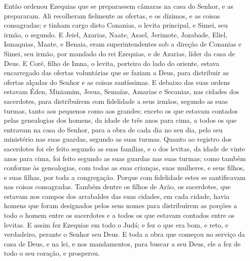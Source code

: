 Então ordenou Ezequias que se preparassem câmaras na casa do
Senhor, e as prepararam. Ali recolheram fielmente as ofertas,
e os dízimos, e as coisas consagradas; e tinham cargo disto
Conanias, o levita principal, e Simei, seu irmão, o segundo.
E Jeiel, Azarias, Naate, Asael, Jerimote, Jozabade, Eliel,
Ismaquias, Maate, e Benaia, eram superintendentes sob a direção de
Conanias e Simei, seu irmão, por mandado do rei Ezequias, e de
Azarias, líder da casa de Deus. E Coré, filho de Imna, o
levita, porteiro do lado do oriente, estava encarregado das ofertas
voluntárias que se faziam a Deus, para distribuir as ofertas alçadas
do Senhor e as coisas santíssimas. E debaixo das suas ordens
estavam Éden, Miniamim, Jesua, Semaías, Amarias e Secanias, nas
cidades dos sacerdotes, para distribuírem com fidelidade a seus
irmãos, segundo as suas turmas, tanto aos pequenos como aos grandes;
exceto os que estavam contados pelas genealogias dos homens,
da idade de três anos para cima, a todos os que entravam na casa do
Senhor, para a obra de cada dia no seu dia, pelo seu ministério nas
suas guardas, segundo as suas turmas. Quanto ao registro dos
sacerdotes foi ele feito segundo as suas famílias, e o dos levitas,
da idade de vinte anos para cima, foi feito segundo as suas guardas
nas suas turmas; como também conforme às genealogias, com
todas as suas crianças, suas mulheres, e seus filhos, e suas filhas,
por toda a congregação. Porque com fidelidade estes se santificavam
nas coisas consagradas. Também dentre os filhos de Arão, os
sacerdotes, que estavam nos campos dos arrabaldes das suas cidades,
em cada cidade, havia homens que foram designados pelos seus nomes
para distribuírem as porções a todo o homem entre os sacerdotes e a
todos os que estavam contados entre os levitas. E assim fez
Ezequias em todo o Judá; e fez o que era bom, e reto, e verdadeiro,
perante o Senhor seu Deus. E toda a obra que começou no
serviço da casa de Deus, e na lei, e nos mandamentos, para buscar a
seu Deus, ele a fez de todo o seu coração, e prosperou.

\medskip

